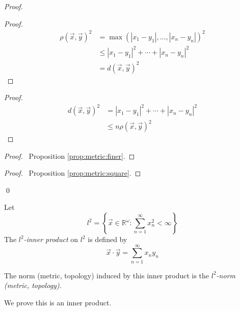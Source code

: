 \begin{proof}
  \pf
  \begin{proof}
    \pf
    \begin{align*}
      \rho(\vec{x}, \vec{y})^2 & = \max(|x_1 - y_1|, \ldots, |x_n - y_n|)^2 \\
      & \leq |x_1 - y_1|^2 + \cdots + |x_n - y_n|^2 \\
      & = d(\vec{x}, \vec{y})^2
    \end{align*}
  \end{proof}
  \begin{proof}
    \pf
    \begin{align*}
      d(\vec{x}, \vec{y})^2 & = |x_1 - y_1|^2 + \cdots + |x_n - y_n|^2 \\
      & \leq n \rho(\vec{x}, \vec{y})^2
    \end{align*}
  \end{proof}
  \begin{proof}
    \pf\ Proposition \ref{prop:metric:finer}.
  \end{proof}
  \qedstep
  \begin{proof}
    \pf\ Proposition \ref{prop:metric:square}.
  \end{proof}
  \qed
\end{proof}

\begin{df}
  Let
  \[ l^2 = \left\{ \vec{x} \in \mathbb{R}^\omega : \sum_{n=1}^\infty x_n^2 < \infty \right\} \]
  The \emph{$l^2$-inner product} on $l^2$ is defined by
  \[ \vec{x} \cdot \vec{y} = \sum_{n=1}^\infty x_n y_n \]

  The norm (metric, topology) induced by this inner product is the \emph{$l^2$-norm (metric, topology)}.

  We prove this is an inner product.
\end{df}

